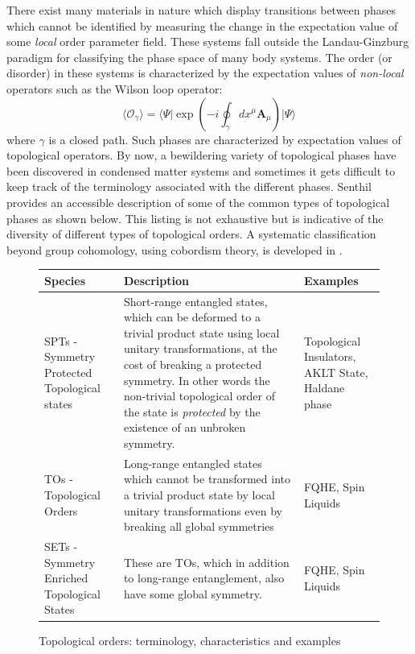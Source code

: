 \documentclass[preprint]{SciPost}
\newcommand{\mb}[1]{\mathbf{#1}}
\newcommand{\mc}[1]{\mathcal{#1}}
\newcommand{\expect}[1]{\langle #1\rangle}
\newcommand{\expectop}[3]{\langle #1 \vert #2 \vert #3 \rangle}
\theoremstyle{plain} %
\begin{document}
There exist many materials in nature which display transitions between phases which cannot be identified by measuring the change in the expectation value of some \emph{local} order parameter field. These systems fall outside the Landau-Ginzburg paradigm for classifying the phase space of many body systems. The order (or disorder) in these systems is characterized by the expectation values of \emph{non-local} operators such as the Wilson loop operator:
\begin{equation}\label{eqn:wilson-loop-expectation}
	\expect{\mc{O}_\gamma} = \expectop{\Psi}{\exp\left(-i\oint_{\gamma} dx^\mu \mb{A}_\mu\right)}{\Psi}
\end{equation}
where $ \gamma $ is a closed path. Such phases are characterized by expectation values of topological operators. By now, a bewildering variety of topological phases have been discovered in condensed matter systems and sometimes it gets difficult to keep track of the terminology associated with the different phases. Senthil \cite{Senthil2015Symmetry-Protected} provides an accessible description of some of the common types of topological phases as shown below. This listing is not exhaustive but is indicative of the diversity of different types of topological orders. A systematic classification beyond group cohomology, using cobordism theory, is developed in \cite{Kapustin2014Symmetry,Freed2021Reflection}.

\begin{figure}[htbp]\label{fig:topo-phases}
	\begin{tabular}{|>{\raggedright\arraybackslash}p{4cm}|p{6cm} |p{4cm} |}
		\hline
		\centering \textbf{Species} & \centering \textbf{Description} & \textbf{Examples} \\ \hline
		SPTs - Symmetry Protected Topological states & Short-range entangled states, which can be deformed to a trivial product state using local unitary transformations, at the cost of breaking a protected symmetry. In other words the non-trivial topological order of the state is \emph{protected} by the existence of an unbroken symmetry. & Topological Insulators, AKLT State, Haldane phase \\ \hline
		TOs - Topological Orders & Long-range entangled states which cannot be transformed into a trivial product state by local unitary transformations even by breaking all global symmetries & FQHE, Spin Liquids     \\ \hline
		SETs - Symmetry Enriched Topological States  & These are TOs, which in addition to long-range entanglement, also have some global symmetry.                                                                            & FQHE, Spin Liquids     \\ \hline
	\end{tabular}%
	\caption{Topological orders: terminology, characteristics and examples}
\end{figure}
\end{document}
